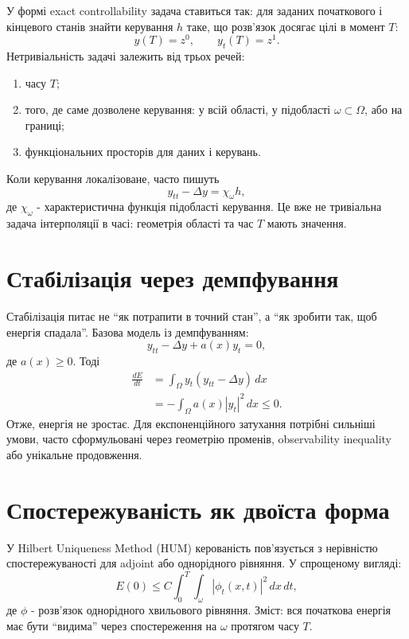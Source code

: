 У формі exact controllability задача ставиться так: для заданих початкового і кінцевого станів знайти керування $h$ таке, що розв'язок досягає цілі в момент $T$:
\begin{equation}
  y(T)=z^0,
  \qquad
  y_t(T)=z^1.
\end{equation}
Нетривіальність задачі залежить від трьох речей:
\begin{enumerate}[label=\arabic*.]
\item часу $T$;
\item того, де саме дозволене керування: у всій області, у підобласті $\omega\subset\Omega$, або на границі;
\item функціональних просторів для даних і керувань.
\end{enumerate}

Коли керування локалізоване, часто пишуть
\begin{equation}
  y_{tt}-\Delta y = \chi_\omega h,
\end{equation}
де $\chi_\omega$ - характеристична функція підобласті керування. Це вже не тривіальна задача інтерполяції в часі: геометрія області та час $T$ мають значення.

\section{Стабілізація через демпфування}

Стабілізація питає не ``як потрапити в точний стан'', а ``як зробити так, щоб енергія спадала''. Базова модель із демпфуванням:
\begin{equation}
  y_{tt}-\Delta y + a(x)y_t = 0,
\end{equation}
де $a(x)\ge 0$. Тоді
\begin{align}
  \frac{dE}{dt}
  &= \int_\Omega y_t(y_{tt}-\Delta y)\,dx \\
  &= -\int_\Omega a(x)|y_t|^2\,dx \le 0.
\end{align}
Отже, енергія не зростає. Для експоненційного затухання потрібні сильніші умови, часто сформульовані через геометрію променів, observability inequality або унікальне продовження.

\section{Спостережуваність як двоїста форма}

У Hilbert Uniqueness Method (HUM) керованість пов'язується з нерівністю спостережуваності для adjoint або однорідного рівняння. У спрощеному вигляді:
\begin{equation}
  E(0) \le C \int_0^T\int_\omega |\phi_t(x,t)|^2\,dx\,dt,
\end{equation}
де $\phi$ - розв'язок однорідного хвильового рівняння. Зміст: вся початкова енергія має бути ``видима'' через спостереження на $\omega$ протягом часу $T$.

